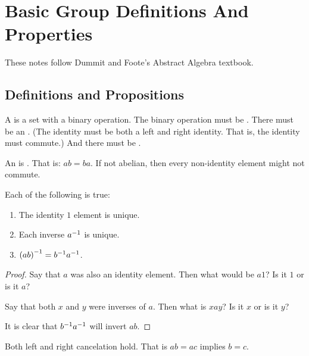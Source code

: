 \section{Basic Group Definitions And Properties}

\begin{remark}
  These notes follow Dummit and Foote's Abstract Algebra textbook.
\end{remark}

\subsection{Definitions and Propositions}

\begin{definition}
  A  is a set with a binary operation. The binary
  operation must be . There must be an
  . (The identity must be both a left and right
  identity. That is, the identity must commute.) And there must be
  .

  An  is . That is: $ab = ba$.
  If not abelian, then every non-identity element might not commute.
\end{definition}

\begin{proposition} Each of the following is true:
  \begin{enumerate}
    \item The identity $1$ element is unique.
    \item Each inverse ${a}^{-1}$ is unique.
    \item $\mathopen{}\left( {ab} \right)^{-1}\mathclose{} = {b}^{-1} {a}^{-1}$.
  \end{enumerate}
\end{proposition}

\begin{proof}
  Say that $a$ was also an identity element. Then what would be $a1$? Is
  it $1$ or is it $a$?

  Say that both $x$ and $y$ were inverses of $a$. Then what is $xay$? Is
  it $x$ or is it $y$?

  It is clear that ${b}^{-1}{a}^{-1}$ will invert $ab$.
\end{proof}

\begin{proposition}
  Both left and right cancelation hold. That is $ab = ac$ implies $b =
  c$.
\end{proposition}


